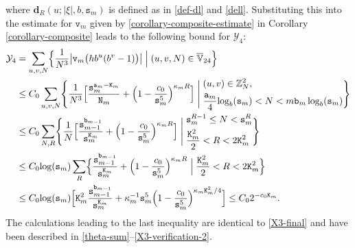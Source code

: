 \documentclass[12pt, twoside]{article}
\def\red{\color{red}}
\theoremstyle{definition}
\numberwithin{equation}{section}
\begin{document}
where $\mathbf d_R(u; {|\xi|}, b, \mathtt s_m)$ is defined as in \eqref{def-dl} and \eqref{dell}.
Substituting this into the estimate for $\mathtt v_m$ given by \eqref{corollary-composite-estimate} in Corollary \ref{corollary-composite} leads to the following bound for $\mathcal Y_4$:
\begin{align}
\mathcal Y_4 &= \sum_{u, v, N} \Bigl\{\frac{1}{N^3}\bigl| \mathtt v_m \bigl( hb^u(b^v-1) \bigr) \bigr| \; \Bigl| \; (u, v, N) \in \overline{\mathbb V}_{24} \Bigr\} \nonumber \\ 
&\leq C_0 \sum_{u, v, N} \Biggl\{ \frac{1}{N^3} \Bigl[ \frac{\mathtt s_m^{\mathtt a_m - \mathtt K_m}}{\mathtt N_m} + \Bigl( 1 - \frac{c_0}{\mathtt s_m^5}\Bigr)^{\kappa_m R} \Bigr] \; \Biggl| \; \begin{aligned} &(u, v) \in \mathbb Z_N^2, \\ &\frac{\mathtt a_m}{4}  {\log_b (\mathtt s_m) } < N < m \mathtt b_m \log_b(\mathtt s_m) \end{aligned} \Biggr\} \nonumber \\
&\leq C_0 \sum_{N, R} \Biggl\{\frac{1}{N} \Bigl[ \frac{\mathtt s_{m-1}^{\mathtt b_{m-1}}}{\mathtt s_m^{\mathtt K_m}} + \Bigl( 1 - \frac{c_0}{\mathtt s_m^5}\Bigr)^{\kappa_m R}\Bigr] \; \Biggl| \; \begin{aligned} &\mathtt s_m^{R-1} \leq N < \mathtt s_m^R \\  &\frac{\mathtt K_m^2}{2} < R < 2\mathtt K_m^2 \end{aligned} \Biggr\} \nonumber \\
&\leq C_0 {\log(\mathtt s_m)} \sum_{R} \Bigl\{\frac{\mathtt s_{m-1}^{\mathtt b_{m-1}}}{\mathtt s_m^{\mathtt K_m}} + \Bigl( 1 - \frac{c_0}{\mathtt s_m^5}\Bigr)^{\kappa_m R} \; \Bigl| \; \frac{\mathtt K_m^2}{2} < R < 2\mathtt K_m^2 \Bigr\} \nonumber \\
&\leq C_0 {\log(\mathtt s_m)} \Bigl[ \mathtt K_m^2 \frac{\mathtt s_{m-1}^{\mathtt b_{m-1}}}{\mathtt s_m^{\mathtt K_m}} + \kappa_m^{-1} \mathtt s_m^5 \Bigl( 1 - \frac{c_0}{\mathtt s_m^5}\Bigr)^{\kappa_m \mathtt K_m^2/4} \Bigr] \leq C_0 2^{-c_0 \mathtt K_m}.  \label{Y4-final}
\end{align} 
The calculations leading to the last inequality are identical to \eqref{X3-final} and have been described in \eqref{theta-sum}--\eqref{X3-verification-2}. 
\end{document}
